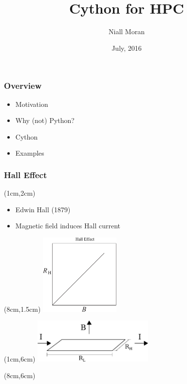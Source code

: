 \documentclass[xcolor=pdftex,dvipsnames]{beamer}
\title[]{Cython for HPC}
\author[]{Niall Moran}
\date{July, 2016}
\begin{document}
\begin{frame}\titlepage
\end{frame}


\begin{frame}
	\frametitle{Overview}
	\begin{itemize}
		\item Motivation
		\item Why (not) Python?
		\item Cython
		\item Examples
	\end{itemize}
\end{frame}

\begin{frame}[t]
	  \frametitle{Hall Effect}
    \begin{textblock*}{6cm}(1cm,2cm) %
    \begin{itemize}
    \item Edwin Hall (1879)
    \item Magnetic field induces Hall current
    \end{itemize}
    \end{textblock*}

    \begin{textblock*}{4cm}(8cm,1.5cm) %
    \includegraphics[width=4cm]{HallEffectCartoon}
    \end{textblock*}

    \begin{textblock*}{6cm}(1cm,6cm) %
    \includegraphics[width=6cm]{FQHE_diagram}
    \end{textblock*}

    \begin{textblock*}{3cm}(8cm,6cm) %
    \end{textblock*}

\end{frame}
    
\end{document}
